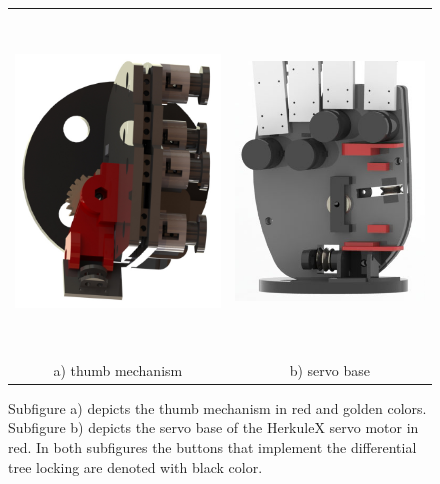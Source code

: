  \begin{figure}[h]
\begin{center}
\begin{tabular}[50]{ c c }
\includegraphics[height=9cm]{figures/paper_images/buttons.JPG}&
\includegraphics[height=9cm]{figures/paper_images/servobase.jpg}\\
{{a) thumb mechanism}} & {{b) servo base}}\\
\end{tabular}
\end{center}
\caption{Subfigure a) depicts the thumb mechanism in red and golden colors. Subfigure b) depicts the servo base of the HerkuleX servo motor in red. In both subfigures the buttons that implement the differential tree locking are denoted with black color.} 
\label{palm}
\end{figure} 

